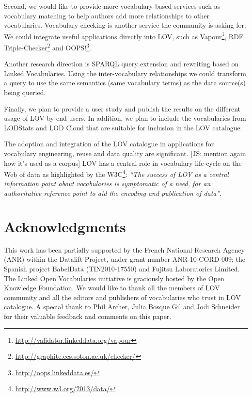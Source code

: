 \documentclass{iosart2c}
\begin{document}
Second, we would like to provide more vocabulary based services such as vocabulary matching to help authors add more relationships to other vocabularies. Vocabulary checking is another service the community is asking for. We could integrate useful applications directly into LOV, such as Vapour\footnote{\url{http://validator.linkeddata.org/vapour}}, RDF Triple-Checker\footnote{\url{http://graphite.ecs.soton.ac.uk/checker/}} and OOPS!\footnote{\url{http://oops.linkeddata.es/}}. 

Another research direction is SPARQL query extension and rewriting based on Linked Vocabularies. Using the inter-vocabulary relationships we could transform a query to use the same semantics (same vocabulary terms) as the data source(s) being queried.

Finally, we plan to provide a user study and publish the results on the different usage of LOV by end users. In addition, we plan to include the vocabularies from LODStats and LOD Cloud that are suitable for inclusion in the LOV catalogue.

The adoption and integration of the LOV catalogue in applications for vocabulary engineering, reuse and data quality are significant. [JS: mention again how it's used as a corpus] LOV has a central role in vocabulary life-cycle on the Web of data as highlighted by the W3C\footnote{\url{http://www.w3.org/2013/data/}}: \textit{``The success of LOV as a central information point about vocabularies is symptomatic of a need, for an authoritative reference point to aid the encoding and publication of data''}.



\section*{Acknowledgments}
This work has been partially supported by the French National Research Agency (ANR) within the Datalift Project, under grant number ANR-10-CORD-009; the Spanish project BabelData (TIN2010-17550) and Fujitsu Laboratories Limited. The Linked Open Vocabularies initiative is graciously hosted by the Open Knowledge Foundation. We would like to thank all the members of LOV community and all the editors and publishers of vocabularies who trust in LOV catalogue. A special thank to Phil Archer, Julia Bosque Gil and Jodi Schneider for their valuable feedback and comments on this paper.



\end{document}
